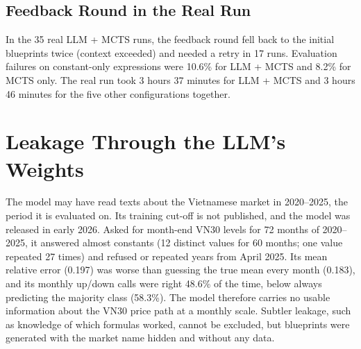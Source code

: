 \documentclass[12pt,a4paper,oneside]{book}
\theoremstyle{definition}
\newif\ifdsr
\begin{document}
\subsection{Feedback Round in the Real Run}

In the 35 real LLM + MCTS runs, the feedback round fell back to the initial blueprints twice (context exceeded) and needed a retry in 17 runs. Evaluation failures on constant-only expressions were 10.6\% for LLM + MCTS and 8.2\% for MCTS only. The real run took 3 hours 37 minutes for LLM + MCTS and 3 hours 46 minutes for the five other configurations together.

\ifdsr
\subsection{Supplementary: Deflated Sharpe Ratio}
\label{sec:dsr}

The Deflated Sharpe Ratio \cite{bailey2014} asks whether a Sharpe ratio exceeds what the best of $N$ trials would reach without skill. Treating each of the 18 real out-of-sample series (five seeds of three search configurations and one series of each deterministic configuration) as a trial, the expected maximum Sharpe ratio under the null, computed from the variance of the 18 daily Sharpe ratios, is 0.89 per year. The Probabilistic Sharpe Ratio of each series against this benchmark, which accounts for the skewness and the fat tails of daily returns (kurtosis 6.8 to 41), gives the DSR. No series reaches the conventional 0.95: the highest are LLM only (0.65, against a PSR of 0.98 relative to zero), MCTS only seed 4 (0.58) and random search seed 3 (0.54); LLM + MCTS seed 1 has 0.35. The 18 trials are not independent (ten series come from two MCTS configurations sharing a grammar, and three configurations contribute one series each), so $N$ and the variance are approximations; the conclusion agrees with the placebo test.
\fi

\section{Leakage Through the LLM's Weights}
\label{sec:leakage}

The model may have read texts about the Vietnamese market in 2020--2025, the period it is evaluated on. Its training cut-off is not published, and the model was released in early 2026. Asked for month-end VN30 levels for 72 months of 2020--2025, it answered almost constants (12 distinct values for 60 months; one value repeated 27 times) and refused or repeated years from April 2025. Its mean relative error (0.197) was worse than guessing the true mean every month (0.183), and its monthly up/down calls were right 48.6\% of the time, below always predicting the majority class (58.3\%). The model therefore carries no usable information about the VN30 price path at a monthly scale. Subtler leakage, such as knowledge of which formulas worked, cannot be excluded, but blueprints were generated with the market name hidden and without any data.
\end{document}
